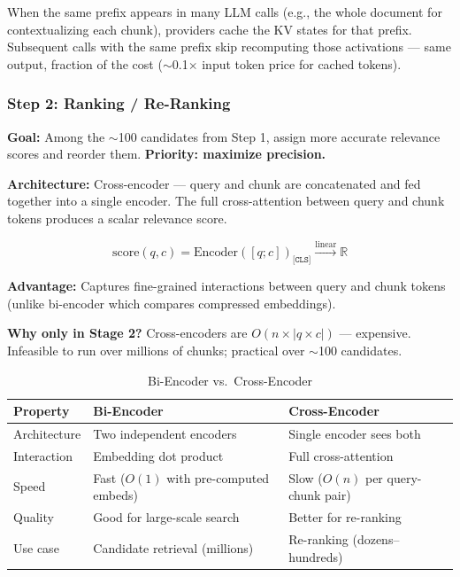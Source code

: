 \documentclass[11pt, a4paper]{article}
\begin{document}
\begin{defbox}
When the same prefix appears in many LLM calls (e.g., the whole document for contextualizing each chunk), providers cache the KV states for that prefix. Subsequent calls with the same prefix skip recomputing those activations --- same output, fraction of the cost ($\sim$0.1$\times$ input token price for cached tokens).
\end{defbox}

\subsubsection{Step 2: Ranking / Re-Ranking}

\begin{defbox}
\textbf{Goal:} Among the $\sim$100 candidates from Step 1, assign more accurate relevance scores and reorder them. \textbf{Priority: maximize precision.}

\textbf{Architecture:} Cross-encoder --- query and chunk are concatenated and fed together into a single encoder. The full cross-attention between query and chunk tokens produces a scalar relevance score.

\[
\text{score}(q, c) = \text{Encoder}([q; c])_{\texttt{[CLS]}} \xrightarrow{\text{linear}} \mathbb{R}
\]

\textbf{Advantage:} Captures fine-grained interactions between query and chunk tokens (unlike bi-encoder which compares compressed embeddings).

\textbf{Why only in Stage 2?} Cross-encoders are $O(n \times |q \times c|)$ --- expensive. Infeasible to run over millions of chunks; practical over $\sim$100 candidates.
\end{defbox}

\begin{table}[h]
\centering
\caption{Bi-Encoder vs.\ Cross-Encoder}
\begin{tabular}{@{}lll@{}}
\toprule
\textbf{Property} & \textbf{Bi-Encoder} & \textbf{Cross-Encoder} \\
\midrule
Architecture & Two independent encoders & Single encoder sees both \\
Interaction & Embedding dot product & Full cross-attention \\
Speed & Fast ($O(1)$ with pre-computed embeds) & Slow ($O(n)$ per query-chunk pair) \\
Quality & Good for large-scale search & Better for re-ranking \\
Use case & Candidate retrieval (millions) & Re-ranking (dozens--hundreds) \\
\bottomrule
\end{tabular}
\end{table}
\end{document}
